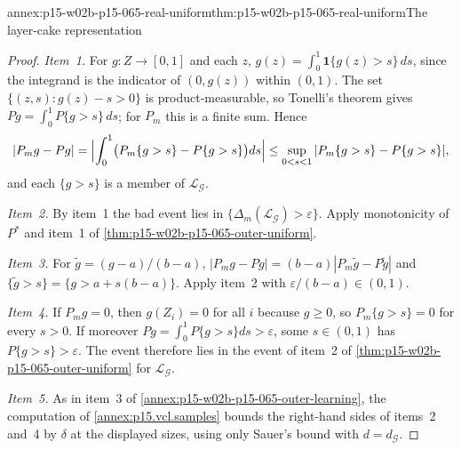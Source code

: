 \begin{annexitem}{annex:p15-w02b-p15-065-real-uniform}{thm:p15-w02b-p15-065-real-uniform}{The layer-cake representation}
\begin{proof}
\emph{Item~1.} For \(g:Z\to[0,1]\) and each \(z\),
\(g(z)=\int_0^1\mathbf1\{g(z)>s\}\,ds\), since the integrand is the
indicator of \((0,g(z))\) within \((0,1)\). The set
\(\{(z,s):g(z)-s>0\}\) is product-measurable, so Tonelli's theorem gives
\(Pg=\int_0^1P\{g>s\}\,ds\); for \(P_m\) this is a finite sum. Hence
\[
 |P_mg-Pg|=\Bigl|\int_0^1\bigl(P_m\{g>s\}-P\{g>s\}\bigr)ds\Bigr|
 \leq\sup_{0<s<1}|P_m\{g>s\}-P\{g>s\}|,
\]
and each \(\{g>s\}\) is a member of \(\mathcal L_{\mathcal G}\).

\emph{Item~2.} By item~1 the bad event lies in
\(\{\Delta_m(\mathcal L_{\mathcal G})>\varepsilon\}\). Apply monotonicity of
\(P^{*}\) and item~1 of \cref{thm:p15-w02b-p15-065-outer-uniform}.

\emph{Item~3.} For \(\tilde g=(g-a)/(b-a)\),
\(|P_mg-Pg|=(b-a)|P_m\tilde g-P\tilde g|\) and
\(\{\tilde g>s\}=\{g>a+s(b-a)\}\). Apply item~2 with
\(\varepsilon/(b-a)\in(0,1)\).

\emph{Item~4.} If \(P_mg=0\), then \(g(Z_i)=0\) for all \(i\) because
\(g\geq0\), so \(P_m\{g>s\}=0\) for every \(s>0\). If moreover
\(Pg=\int_0^1P\{g>s\}ds>\varepsilon\), some \(s\in(0,1)\) has
\(P\{g>s\}>\varepsilon\). The event therefore lies in the event of item~2
of \cref{thm:p15-w02b-p15-065-outer-uniform} for \(\mathcal L_{\mathcal G}\).

\emph{Item~5.} As in item~3 of
\cref{annex:p15-w02b-p15-065-outer-learning}, the computation of
\cref{annex:p15.vcl.samples} bounds the right-hand sides of items~2 and~4 by
\(\delta\) at the displayed sizes, using only Sauer's bound with
\(d=d_{\mathcal G}\).
\end{proof}
\end{annexitem}

